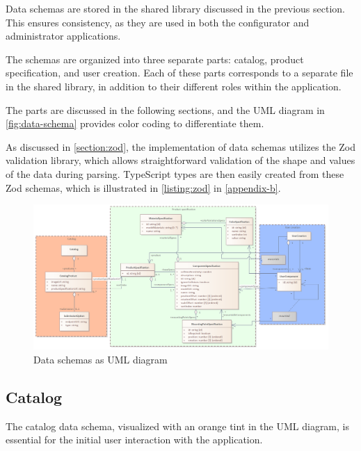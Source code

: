 Data schemas are stored in the shared library discussed in the previous section. This ensures consistency, as they are used in both the configurator and administrator applications. 

The schemas are organized into three separate parts: catalog, product specification, and user creation. Each of these parts corresponds to a separate file in the shared library, in addition to their different roles within the application.

The parts are discussed in the following sections, and the UML diagram in \autoref{fig:data-schema} provides color coding to differentiate them.

As discussed in \autoref{section:zod}, the implementation of data schemas utilizes the Zod validation library, which allows straightforward validation of the shape and values of the data during parsing. TypeScript types are then easily created from these Zod schemas, which is illustrated in \autoref{listing:zod} in \autoref{appendix-b}.~\cite{Wycliffe2023} 

\begin{landscape}
\begin{figure}[h]
\centering
\includegraphics[width=\linewidth]{images/uml_dataschema.png}
\caption{Data schemas as UML diagram}
\label{fig:data-schema}
\end{figure}
\end{landscape}

\subsection{Catalog}

The catalog data schema, visualized with an orange tint in the UML diagram, is essential for the initial user interaction with the application.

